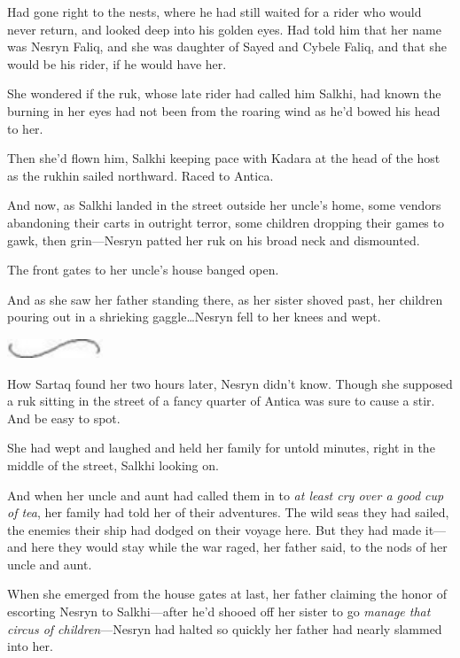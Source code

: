 Had gone right to the nests, where he had still waited for a rider who would never return, and looked deep into his golden eyes.
Had told him that her name was Nesryn Faliq, and she was daughter of Sayed and Cybele Faliq, and that she would be his rider, if he would have her.

She wondered if the ruk, whose late rider had called him Salkhi, had known the burning in her eyes had not been from the roaring wind as he'd bowed his head to her.

Then she'd flown him, Salkhi keeping pace with Kadara at the head of the host as the rukhin sailed northward.
Raced to Antica.

And now, as Salkhi landed in the street outside her uncle's home, some vendors abandoning their carts in outright terror, some children dropping their games to gawk, then grin---Nesryn patted her ruk on his broad neck and dismounted.

The front gates to her uncle's house banged open.

And as she saw her father standing there, as her sister shoved past, her children pouring out in a shrieking gaggle\ldots Nesryn fell to her knees and wept.

\begin{center}
	\includegraphics[width=1.12in,height=0.24in]{images/seperator}
\end{center}

How Sartaq found her two hours later, Nesryn didn't know.
Though she supposed a ruk sitting in the street of a fancy quarter of Antica was sure to cause a stir.
And be easy to spot.

She had wept and laughed and held her family for untold minutes, right in the middle of the street, Salkhi looking on.

And when her uncle and aunt had called them in to \emph{at least cry over a good cup of tea}, her family had told her of their adventures.
The wild seas they had sailed, the enemies their ship had dodged on their voyage here.
But they had made it---and here they would stay while the war raged, her father said, to the nods of her uncle and aunt.

When she emerged from the house gates at last, her father claiming the honor of escorting Nesryn to Salkhi---after he'd shooed off her sister to go \emph{manage that circus of children}---Nesryn had halted so quickly her father had nearly slammed into her.

